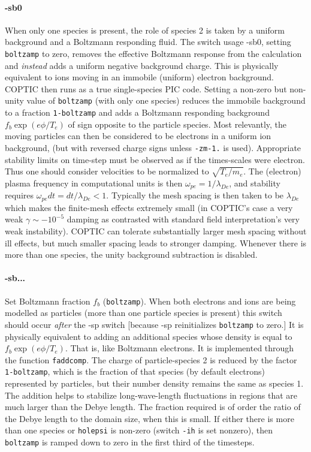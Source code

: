 \documentclass[12pt]{article}
\begin{document}
\paragraph{-sb0} When only one species is present, the role of species
2 is taken by a uniform background and a Boltzmann responding
fluid. The switch usage -sb0, setting \verb!boltzamp! to zero, removes
the effective Boltzmann response from the calculation and
\emph{instead} adds a uniform negative background charge.  This is
physically equivalent to ions moving in an immobile (uniform) electron
background.  COPTIC then runs as a true single-species PIC
code. Setting a non-zero but non-unity value of \verb!boltzamp! (with
only one species) reduces the immobile background to a fraction
\verb!1-boltzamp! and adds a Boltzmann responding background
$f_b\exp(e\phi/T_e)$ of sign opposite to the particle species. Most
relevantly, the moving particles can then be considered to be
electrons in a uniform ion background, (but with reversed charge signs
unless \verb!-zm-1.! is used). Appropriate stability limits on
time-step must be observed as if the times-scales were electron. Thus
one should consider velocities to be normalized to
$\sqrt{T_e/m_e}$. The (electron) plasma frequency in computational
units is then $\omega_{pe}=1/\lambda_{De}$, and stability requires
$\omega_{pe}dt = dt/\lambda_{De}<1$. Typically the mesh spacing is
then taken to be $\lambda_{De}$ which makes the finite-mesh effects
extremely small (in COPTIC's case a very weak $\gamma \sim -10^{-5}$
damping as contrasted with standard field interpretation's very weak
instability). COPTIC can tolerate substantially larger mesh spacing
without ill effects, but much smaller spacing leads to stronger
damping. Whenever there is more than one species, the unity background
subtraction is disabled.

\paragraph{-sb...} Set Boltzmann fraction $f_b$
(\verb!boltzamp!). When both electrons and ions are being modelled as
particles (more than one particle species is present) this switch
should occur \emph{after} the -sp switch [because -sp reinitializes
\verb!boltzamp! to zero.] It is physically equivalent
to adding an additional species whose density is equal to
$f_b\exp(e\phi/T_e)$. That is, like Boltzmann electrons.  It is
implemented through the function \verb!faddcomp!. The charge of
particle-species 2 is reduced by the factor \verb!1-boltzamp!, which
is the fraction of that species (by default electrons) represented by
particles, but their number density remains the same as species 1.  The
addition helps to stabilize long-wave-length fluctuations in regions
that are much larger than the Debye length. The fraction required is
of order the ratio of the Debye length to the domain size, when this
is small. If either there is more than one species or \verb!holepsi!
is non-zero (switch \verb!-ih! is set nonzero), then \verb!boltzamp!
is ramped down to zero in the first third of the timesteps.
\end{document}
